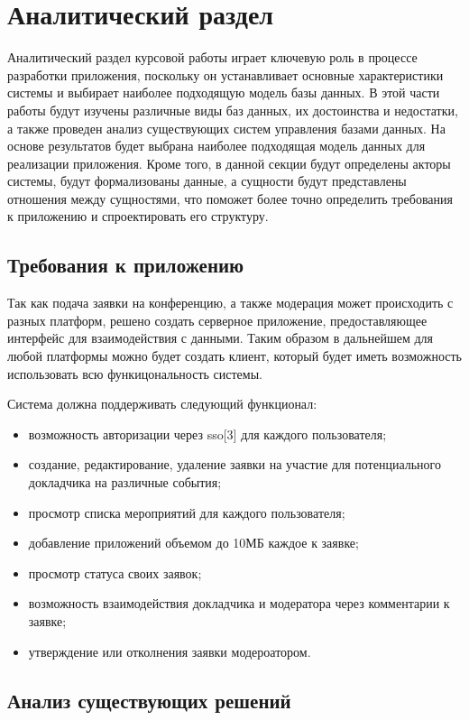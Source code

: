 \section{Аналитический раздел} \label{analysis}


Аналитический раздел курсовой работы играет ключевую роль в процессе разработки приложения, поскольку он устанавливает основные характеристики системы и выбирает наиболее подходящую модель базы данных. В этой части работы будут изучены различные виды баз данных, их достоинства и недостатки, а также проведен анализ существующих систем управления базами данных. На основе результатов будет выбрана наиболее подходящая модель данных для реализации приложения. Кроме того, в данной секции будут определены акторы системы, будут формализованы данные, а сущности будут представлены отношения между сущностями, что поможет более точно определить требования к приложению и спроектировать его структуру.

\subsection{Требования к приложению}

Так как подача заявки на конференцию, а также модерация может происходить с разных платформ, решено создать серверное приложение, предоставляющее интерфейс для взаимодействия с данными.  Таким образом в дальнейшем для любой платформы можно будет создать клиент, который будет иметь возможность использовать всю функицональность системы.

Система должна поддерживать следующий функционал:
\begin{itemize}[label=---]
		\item возможность авторизации через sso[3] для каждого пользователя;
		\item создание, редактирование, удаление заявки на участие для потенциального докладчика на различные события;
		\item просмотр списка мероприятий для каждого пользователя;
		\item добавление приложений объемом до 10МБ каждое к заявке;
		\item просмотр статуса своих заявок;
		\item возможность взаимодействия докладчика и модератора через комментарии к заявке;
		\item утверждение или отколнения заявки модероатором.
\end{itemize}

\subsection{Анализ существующих решений}

